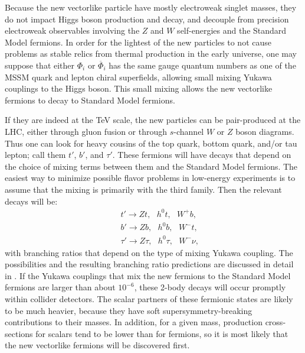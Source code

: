 \documentclass[12pt]{article}
\def\beq{\begin{eqnarray}}
\def\eeq{\end{eqnarray}}
\begin{document}
Because the new vectorlike particle have mostly electroweak singlet 
masses, they do not impact Higgs boson production and decay, and 
decouple from precision electroweak observables involving the $Z$ and 
$W$ self-energies and the Standard Model fermions.  In order for the 
lightest of the new particles to not cause problems as stable relics 
from thermal production in the early universe, one may suppose that 
either $\Phi_i$ or $\overline \Phi_i$ has the same gauge quantum numbers 
as one of the MSSM quark and lepton chiral superfields, allowing small 
mixing Yukawa couplings to the Higgs boson. This small mixing allows the 
new vectorlike fermions to decay to Standard Model fermions.

If they are indeed at the TeV scale, the new particles can be 
pair-produced at the LHC, either through gluon fusion or through 
$s$-channel $W$ or $Z$ boson diagrams. Thus one can look for heavy 
cousins of the top quark, bottom quark, and/or tau lepton; call them 
$t'$, $b'$, and $\tau'$. These fermions will have decays that depend on 
the choice of mixing terms between them and the Standard Model fermions. 
The easiest way to minimize possible flavor problems in low-energy 
experiments is to assume that the mixing is primarily with the third 
family. Then the relevant decays will be:
\beq
&&t' \rightarrow Zt,\>\>\>h^0 t,\>\>\> W^+b,
\\
&&b' \rightarrow Zb,\>\>\>h^0 b,\>\>\> W^-t,
\\
&&\tau' \rightarrow Z\tau,\>\>\>h^0 \tau,\>\>\> W^-\nu,
\eeq
with branching ratios that depend on the type of mixing Yukawa coupling. 
The possibilities and the resulting branching ratio predictions
are discussed in detail in \cite{Martin:2009bg}. 
If the Yukawa couplings that mix the
new fermions to the Standard Model fermions are larger than about $10^{-6}$, these
2-body decays will occur promptly within collider detectors. The scalar partners
of these fermionic states are likely to be much heavier, because they have soft 
supersymmetry-breaking contributions to their masses. In addition, for a given
mass, production 
cross-sections for scalars tend to be lower than for fermions, so it is 
most likely that the new vectorlike fermions will be discovered first.
\end{document}
